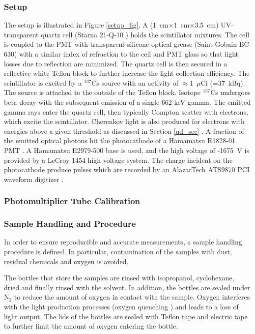 \documentclass{JINST}
\begin{document}
\subsubsection{Setup}
The setup is illustrated in Figure \ref{setup_fig}. A (1~cm$\times$1~cm$\times$3.5~cm) UV-transparent quartz cell (Starna 21-Q-10 \cite{starnacells}) holds the scintillator mixtures. The cell is coupled to the PMT with transparent silicone optical grease (Saint Gobain BC-630) with a similar index of refraction to the cell and PMT glass so that light losses due to reflection are minimized. The quartz cell is then secured in a reflective white Teflon block to further increase the light collection efficiency. The scintillator is excited by a ${^{137}}$Cs source with an activity of $\approx$1~$\mu$Ci (=37~kBq). The source is attached to the outside of the Teflon block. Isotope ${^{137}}$Cs undergoes beta decay with the subsequent emission of a single 662 keV gamma. The emitted gamma rays enter the quartz cell, then typically Compton scatter with electrons, which excite the scintillator. Cherenkov light is also produced for electrons with energies above a given threshold as discussed in Section  \ref{qd_sec} . A fraction of the emitted optical photons hit the photocathode of a Hamamatsu R1828-01 PMT \cite{hamamatsupmt}. A Hamamatsu E2979-500 base \cite{hamamatsubase} is used, and the high voltage of -1675~V is provided by a LeCroy 1454 high voltage system. The charge incident on the photocathode produce pulses which are recorded by an AlazarTech ATS9870 PCI waveform digitizer \cite{alazartech}. 

\subsubsection{Photomultiplier Tube Calibration}

\subsubsection{Sample Handling and Procedure}
In order to ensure reproducible and accurate measurements, a sample handling procedure is defined. In particular, contamination of the samples with dust, residual chemicals and oxygen is avoided.  

The bottles that store the samples are rinsed with isopropanol, cyclohexane, dried and finally rinsed with the solvent. In addition, the bottles are sealed under N$_{2}$ to reduce the amount of oxygen in contact with the sample. Oxygen interferes with the light production processes (oxygen quenching \cite{birks64}) and leads to a loss of light output. The lids of the bottles are sealed with Teflon tape and electric tape to further limit the amount of oxygen entering the bottle. 
\end{document}

